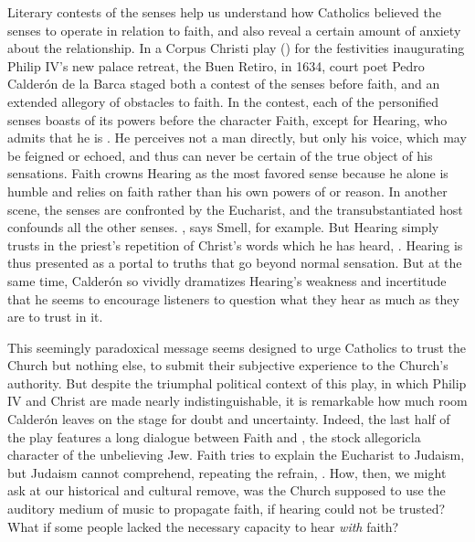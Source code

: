 \documentclass[tt]{vcbook-proposal}
\begin{document}
Literary contests of the senses help us understand how Catholics believed the senses to operate in relation to faith, and also reveal a certain amount of anxiety about the relationship.
In a Corpus Christi play () for the festivities inaugurating Philip IV's new palace retreat, the Buen Retiro, in 1634, court poet Pedro Calderón de la Barca staged both a contest of the senses before faith, and an extended allegory of obstacles to faith.
In the contest, each of the personified senses boasts of its powers before the character Faith, except for Hearing, who admits that he is .
He perceives not a man directly, but only his voice, which may be feigned or echoed, and thus can never be certain of the true object of his sensations.
Faith crowns Hearing as the most favored sense because he alone is humble and relies on faith rather than his own powers of  or reason.
In another scene, the senses are confronted by the Eucharist, and the transubstantiated host confounds all the other senses.
, says Smell, for example.
But Hearing simply trusts in the priest's repetition of Christ's words which he has heard, .
Hearing is thus presented as a portal to truths that go beyond normal sensation.
But at the same time, Calderón so vividly dramatizes Hearing's weakness and incertitude that he seems to encourage listeners to question what they hear as much as they are to trust in it.

This seemingly paradoxical message seems designed to urge Catholics to trust the Church but nothing else, to submit their subjective experience to the Church's authority.
But despite the triumphal political context of this play, in which Philip IV and Christ are made nearly indistinguishable, it is remarkable how much room Calderón leaves on the stage for doubt and uncertainty.
Indeed, the last half of the play features a long dialogue between Faith and , the stock allegoricla character of the unbelieving Jew.
Faith tries to explain the Eucharist to Judaism, but Judaism cannot comprehend, repeating the refrain, .
How, then, we might ask at our historical and cultural remove, was the Church supposed to use the auditory medium of music to propagate faith, if hearing could not be trusted? 
What if some people lacked the necessary capacity to hear  \emph{with} faith?
\end{document}
